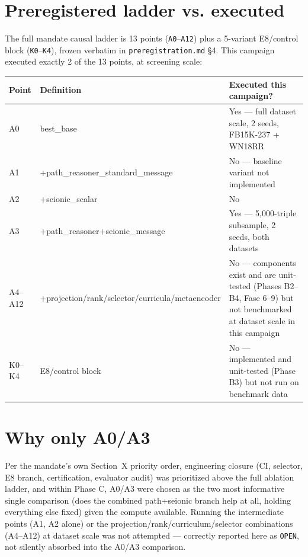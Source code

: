 \documentclass[11pt]{article}
\begin{document}

\tableofcontents

\section{Preregistered ladder vs. executed}
The full mandate causal ladder is 13 points (\texttt{A0}--\texttt{A12}) plus a 5-variant E8/control
block (\texttt{K0}--\texttt{K4}), frozen verbatim in \texttt{preregistration.md} \S4. This campaign
executed exactly 2 of the 13 points, at screening scale:
\begin{center}
\begin{tabular}{@{}p{}p{}p{}@{}}
\toprule
Point & Definition & Executed this campaign? \\
\midrule
A0 & best\_base & Yes --- full dataset scale, 2 seeds, FB15K-237 + WN18RR \\
A1 & +path\_reasoner\_standard\_message & No --- baseline variant not implemented \\
A2 & +seionic\_scalar & No \\
A3 & +path\_reasoner+seionic\_message & Yes --- 5,000-triple subsample, 2 seeds, both datasets \\
A4--A12 & +projection/\allowbreak rank/\allowbreak selector/\allowbreak curricula/\allowbreak metaencoder & No --- components exist and are unit-tested (Phases B2--B4, Fase 6--9) but not benchmarked at dataset scale in this campaign \\
K0--K4 & E8/control block & No --- implemented and unit-tested (Phase B3) but not run on benchmark data \\
\bottomrule
\end{tabular}
\end{center}

\section{Why only A0/A3}
Per the mandate's own Section~X priority order, engineering closure (CI, selector, E8 branch,
certification, evaluator audit) was prioritized above the full ablation ladder, and within Phase C,
A0/A3 were chosen as the two most informative single comparison (does the combined path+seionic
branch help at all, holding everything else fixed) given the compute available. Running the
intermediate points (A1, A2 alone) or the projection/rank/curriculum/selector combinations
(A4--A12) at dataset scale was not attempted --- correctly reported here as \texttt{OPEN}, not
silently absorbed into the A0/A3 comparison.
\end{document}
